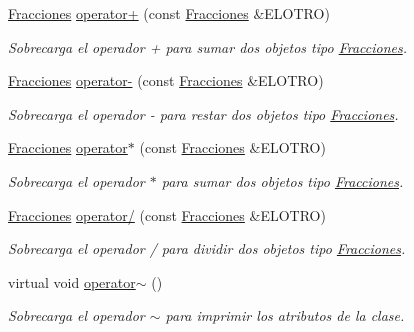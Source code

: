 \begin{DoxyCompactItemize}
\hypertarget{class_fracciones_a65990db722cdd8f314bd871fdf1d6300}{}\label{class_fracciones_a65990db722cdd8f314bd871fdf1d6300} 
\hyperlink{class_fracciones}{Fracciones} \hyperlink{class_fracciones_a65990db722cdd8f314bd871fdf1d6300}{operator+} (const \hyperlink{class_fracciones}{Fracciones} \&E\+L\+O\+T\+RO)
\begin{DoxyCompactList}\small\item\em Sobrecarga el operador + para sumar dos objetos tipo \hyperlink{class_fracciones}{Fracciones}. \end{DoxyCompactList}\item 
\hypertarget{class_fracciones_ab2be72a106f2be0a70439bce748191df}{}\label{class_fracciones_ab2be72a106f2be0a70439bce748191df} 
\hyperlink{class_fracciones}{Fracciones} \hyperlink{class_fracciones_ab2be72a106f2be0a70439bce748191df}{operator-\/} (const \hyperlink{class_fracciones}{Fracciones} \&E\+L\+O\+T\+RO)
\begin{DoxyCompactList}\small\item\em Sobrecarga el operador -\/ para restar dos objetos tipo \hyperlink{class_fracciones}{Fracciones}. \end{DoxyCompactList}\item 
\hypertarget{class_fracciones_a73e2ae51549f78e26ab573a5f6767db5}{}\label{class_fracciones_a73e2ae51549f78e26ab573a5f6767db5} 
\hyperlink{class_fracciones}{Fracciones} \hyperlink{class_fracciones_a73e2ae51549f78e26ab573a5f6767db5}{operator$\ast$} (const \hyperlink{class_fracciones}{Fracciones} \&E\+L\+O\+T\+RO)
\begin{DoxyCompactList}\small\item\em Sobrecarga el operador $\ast$ para sumar dos objetos tipo \hyperlink{class_fracciones}{Fracciones}. \end{DoxyCompactList}\item 
\hypertarget{class_fracciones_a7d1c20bbe377228aa6b24e01cf64b900}{}\label{class_fracciones_a7d1c20bbe377228aa6b24e01cf64b900} 
\hyperlink{class_fracciones}{Fracciones} \hyperlink{class_fracciones_a7d1c20bbe377228aa6b24e01cf64b900}{operator/} (const \hyperlink{class_fracciones}{Fracciones} \&E\+L\+O\+T\+RO)
\begin{DoxyCompactList}\small\item\em Sobrecarga el operador / para dividir dos objetos tipo \hyperlink{class_fracciones}{Fracciones}. \end{DoxyCompactList}\item 
\hypertarget{class_fracciones_a10601a56b48b37141581e4b4e2510c79}{}\label{class_fracciones_a10601a56b48b37141581e4b4e2510c79} 
virtual void \hyperlink{class_fracciones_a10601a56b48b37141581e4b4e2510c79}{operator$\sim$} ()
\begin{DoxyCompactList}\small\item\em Sobrecarga el operador $\sim$ para imprimir los atributos de la clase. \end{DoxyCompactList}\end{DoxyCompactItemize}
